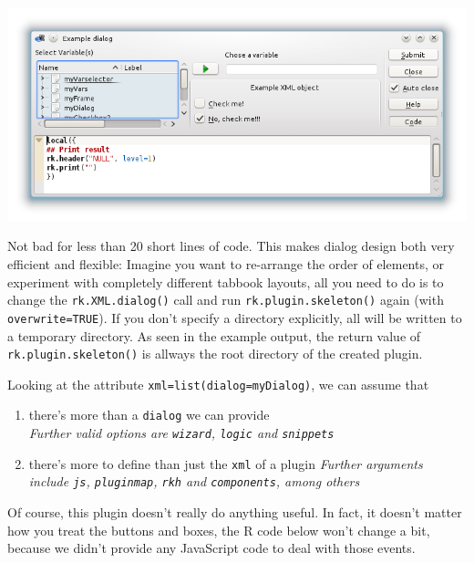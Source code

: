 \documentclass[a4paper,10pt]{scrartcl}
\begin{document}
\begin{center}
 \includegraphics{./RKWard_vign_example_dialog_wcode.png}
\end{center}

Not bad for less than 20 short lines of code. This makes dialog design both very efficient and flexible:
Imagine you want to re-arrange the order of elements, or experiment with completely different tabbook layouts, all you need to
do is to change the \texttt{rk.XML.dialog()} call and run \texttt{rk.plugin.skeleton()} again (with \texttt{overwrite=TRUE}).
If you don't specify a directory explicitly, all will be written to a temporary directory. As seen in the example output,
the return value of \texttt{rk.plugin.skeleton()} is allways the root directory of the created plugin.

Looking at the attribute \texttt{xml=list(dialog=myDialog)}, we can assume that

\begin{enumerate}
	\item there's more than a \texttt{dialog} we can provide\\
		\textit{Further valid options are \texttt{wizard}, \texttt{logic} and \texttt{snippets}}
	\item there's more to define than just the \texttt{xml} of a plugin
		\textit{Further arguments include \texttt{js}, \texttt{pluginmap}, \texttt{rkh} and \texttt{components}, among others}
\end{enumerate}

Of course, this plugin doesn't really do anything useful. In fact, it doesn't matter how you treat the buttons and boxes, the R code below
won't change a bit, because we didn't provide any JavaScript code to deal with those events.
\end{document}
